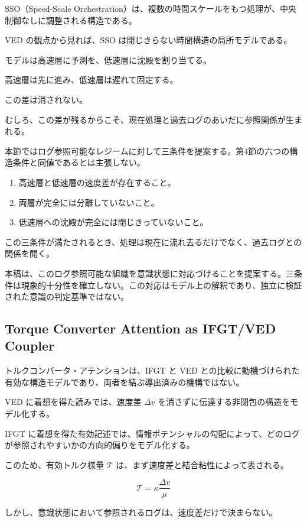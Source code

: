 SSO（Speed-Scale Orchestration）は、複数の時間スケールをもつ処理が、中央制御なしに調整される構造である。

VED の観点から見れば、SSO は閉じきらない時間構造の局所モデルである。

モデルは高速層に予測を、低速層に沈殿を割り当てる。

高速層は先に進み、低速層は遅れて固定する。

この差は消されない。

むしろ、この差が残るからこそ、現在処理と過去ログのあいだに参照関係が生まれる。

本節ではログ参照可能なレジームに対して三条件を提案する。第4節の六つの構造条件と同値であるとは主張しない。

\begin{enumerate}
\item 高速層と低速層の速度差が存在すること。
\item 両層が完全には分離していないこと。
\item 低速層への沈殿が完全には閉じきっていないこと。
\end{enumerate}

この三条件が満たされるとき、処理は現在に流れ去るだけでなく、過去ログとの関係を開く。

本稿は、このログ参照可能な組織を意識状態に対応づけることを提案する。三条件は現象的十分性を確立しない。この対応はモデル上の解釈であり、独立に検証された意識の判定基準ではない。

\subsection{Torque Converter Attention as IFGT/VED Coupler}

トルクコンバータ・アテンションは、IFGT と VED との比較に動機づけられた有効な構造モデルであり、両者を結ぶ導出済みの機構ではない。

VED に着想を得た読みでは、速度差 $\Delta v$ を消さずに伝達する非閉包の構造をモデル化する。

IFGT に着想を得た有効記述では、情報ポテンシャルの勾配によって、どのログが参照されやすいかの方向的偏りをモデル化する。

このため、有効トルク様量 $\mathcal{T}$ は、まず速度差と結合粘性によって表される。

\begin{equation}
\mathcal{T} =
\kappa
\frac{\Delta v}{\mu}
\end{equation}

しかし、意識状態において参照されるログは、速度差だけで決まらない。

